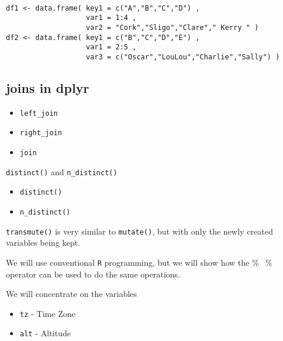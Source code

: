 

\begin{framed}
\begin{verbatim}

df1 <- data.frame( key1 = c("A","B","C","D") , 
                   var1 = 1:4 , 
                   var2 = "Cork","Sligo","Clare"," Kerry " )
df2 <- data.frame( key1 = c("B","C","D","E") , 
                   var1 = 2:5 , 
                   var3 = c("Oscar","LouLou","Charlie","Sally") )

\end{verbatim}
\end{framed}


\subsection{joins in dplyr}

\begin{itemize}
\item \texttt{left_join} 
\item \texttt{right_join}
\item \texttt{join}
\end{itemize}



\texttt{distinct()}  and \texttt{n_distinct()}

\begin{itemize}
\item \texttt{distinct()}  
\item \texttt{n\_distinct()}
\end{itemize}



\texttt{transmute()} is very similar to \texttt{mutate()}, 
but with only the newly created variables being kept.

We will use conventional \texttt{R} programming, but we will show how the $\%\;\>\;\%$ 
operator can be used to do the same operations.

We will concentrate on the variables
\begin{itemize}
\item \texttt{tz}  - Time Zone
\item \texttt{alt} - Altitude
\end{itemize}

